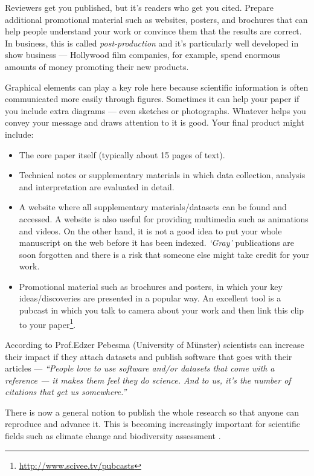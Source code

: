 \documentclass[graybox,envcountchap,sectrefs,UStrade]{svmono}
\begin{document}
Reviewers get you published, but it's readers who get you cited. Prepare additional promotional material such as websites, posters, and brochures that can help people understand your work or convince them that the results are correct. In business, this is called \emph{post-production} and it's particularly well developed in show business --- Hollywood film companies, for example, spend enormous amounts of money promoting their new products.\par

Graphical elements can play a key role here because scientific information is often communicated more easily through figures. Sometimes it can help your paper if you include extra diagrams --- even sketches or photographs. Whatever helps you convey your message and draws attention to it is good. Your final product might include:

\begin{itemize}
 \item The core paper itself (typically about 15 pages of text).
 \item Technical notes or supplementary materials in which data collection, analysis and interpretation are evaluated in detail.
 \item A website where all supplementary materials/datasets can be found and accessed. A website is also useful for providing multimedia such as animations and videos. On the other hand, it is not a good idea to put your whole manuscript on the web before it has been indexed. \emph{`Gray'} publications are soon forgotten and there is a risk that someone else might take credit for your work.
 \item Promotional material such as brochures and posters, in which your key ideas/discoveries are presented in a popular way. An excellent tool is a \textsf{pubcast} in which you talk to camera about your work and then link this clip to your paper\footnote{\url{http://www.scivee.tv/pubcasts}}.
\end{itemize}

According to Prof.\@ Edzer Pebesma (University of M\"{u}nster) scientists can increase their impact if they attach datasets and publish software that goes with their articles --- \emph{``People love to use software and/or datasets that come with a reference --- it makes them feel they do science. And to us, it's the number of citations that get us somewhere.''}\par

There is now a general notion to publish the whole research so that anyone can reproduce and advance it. This is becoming increasingly important for scientific fields such as climate change and biodiversity assessment \citep{Kleiner2011}. \par
\end{document}

